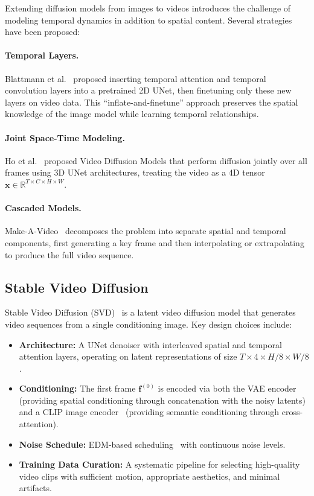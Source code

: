 Extending diffusion models from images to videos introduces the challenge of modeling temporal dynamics in addition to spatial content. Several strategies have been proposed:

\paragraph{Temporal Layers.}
Blattmann et al.~\cite{blattmann2023align} proposed inserting temporal attention and temporal convolution layers into a pretrained 2D UNet, then finetuning only these new layers on video data. This ``inflate-and-finetune'' approach preserves the spatial knowledge of the image model while learning temporal relationships.

\paragraph{Joint Space-Time Modeling.}
Ho et al.~\cite{ho2022video} proposed Video Diffusion Models that perform diffusion jointly over all frames using 3D UNet architectures, treating the video as a 4D tensor $\mathbf{x} \in \mathbb{R}^{T \times C \times H \times W}$.

\paragraph{Cascaded Models.}
Make-A-Video~\cite{singer2023makeavideo} decomposes the problem into separate spatial and temporal components, first generating a key frame and then interpolating or extrapolating to produce the full video sequence.

\subsection{Stable Video Diffusion}
\label{subsec:svd}

Stable Video Diffusion (SVD)~\cite{blattmann2023stable} is a latent video diffusion model that generates video sequences from a single conditioning image. Key design choices include:

\begin{itemize}
    \item \textbf{Architecture:} A UNet denoiser with interleaved spatial and temporal attention layers, operating on latent representations of size $T \times 4 \times H/8 \times W/8$.
    \item \textbf{Conditioning:} The first frame $\mathbf{f}^{(0)}$ is encoded via both the VAE encoder (providing spatial conditioning through concatenation with the noisy latents) and a CLIP image encoder~\cite{radford2021learning} (providing semantic conditioning through cross-attention).
    \item \textbf{Noise Schedule:} EDM-based scheduling~\cite{karras2022elucidating} with continuous noise levels.
    \item \textbf{Training Data Curation:} A systematic pipeline for selecting high-quality video clips with sufficient motion, appropriate aesthetics, and minimal artifacts.
\end{itemize}

